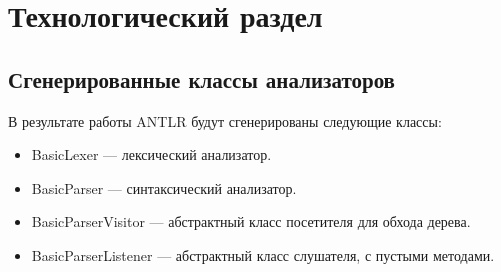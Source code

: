 

\chapter{Технологический раздел}

\section{Сгенерированные классы анализаторов}

В результате работы ANTLR будут сгенерированы следующие классы:
\begin{itemize}
	\item BasicLexer — лексический анализатор.
	\item BasicParser — синтаксический анализатор.
	\item BasicParserVisitor — абстрактный класс посетителя для обхода дерева.
	\item BasicParserListener — абстрактный класс слушателя, с пустыми методами.
\end{itemize}

